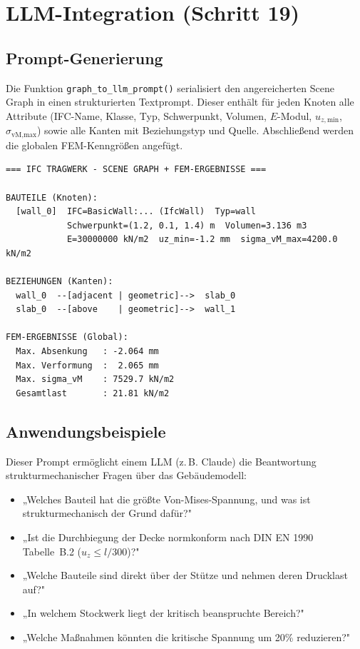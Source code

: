 \documentclass[a4paper,11pt]{article}
\begin{document}
\section{LLM-Integration (Schritt 19)}

\subsection{Prompt-Generierung}

Die Funktion \texttt{graph\_to\_llm\_prompt()} serialisiert den angereicherten Scene Graph in einen strukturierten Textprompt. Dieser enthält für jeden Knoten alle Attribute (IFC-Name, Klasse, Typ, Schwerpunkt, Volumen, $E$-Modul, $u_{z,\text{min}}$, $\sigma_\text{vM,max}$) sowie alle Kanten mit Beziehungstyp und Quelle. Abschließend werden die globalen FEM-Kenngrößen angefügt.

\begin{lstlisting}[style=plain, caption={Schema des LLM-Prompts (graph\_to\_llm\_prompt)}]
=== IFC TRAGWERK - SCENE GRAPH + FEM-ERGEBNISSE ===

BAUTEILE (Knoten):
  [wall_0]  IFC=BasicWall:... (IfcWall)  Typ=wall
            Schwerpunkt=(1.2, 0.1, 1.4) m  Volumen=3.136 m3
            E=30000000 kN/m2  uz_min=-1.2 mm  sigma_vM_max=4200.0 kN/m2

BEZIEHUNGEN (Kanten):
  wall_0  --[adjacent | geometric]-->  slab_0
  slab_0  --[above    | geometric]-->  wall_1

FEM-ERGEBNISSE (Global):
  Max. Absenkung   : -2.064 mm
  Max. Verformung  :  2.065 mm
  Max. sigma_vM    : 7529.7 kN/m2
  Gesamtlast       : 21.81 kN/m2
\end{lstlisting}

\subsection{Anwendungsbeispiele}

Dieser Prompt ermöglicht einem LLM (z.\,B. Claude) die Beantwortung strukturmechanischer Fragen über das Gebäudemodell:

\begin{itemize}[noitemsep]
  \item „Welches Bauteil hat die größte Von-Mises-Spannung, und was ist strukturmechanisch der Grund dafür?"
  \item „Ist die Durchbiegung der Decke normkonform nach DIN EN 1990 Tabelle~B.2 ($u_{z} \leq l/300$)?"
  \item „Welche Bauteile sind direkt über der Stütze und nehmen deren Drucklast auf?"
  \item „In welchem Stockwerk liegt der kritisch beanspruchte Bereich?"
  \item „Welche Maßnahmen könnten die kritische Spannung um 20\% reduzieren?"
\end{itemize}
\end{document}
